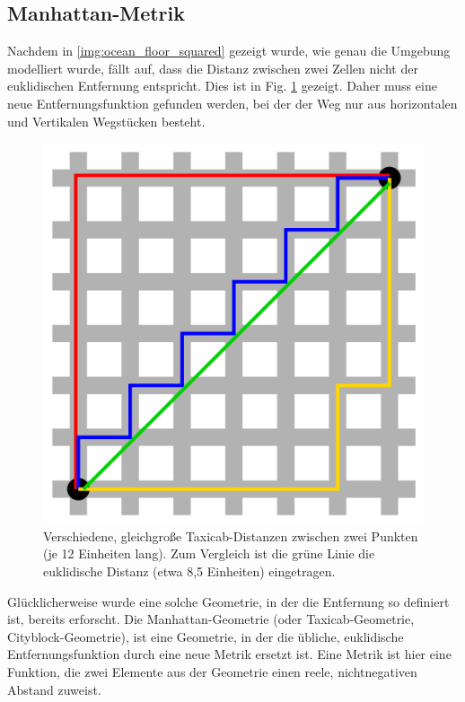\documentclass{article}
\begin{document}
\subsection{Manhattan-Metrik}
\label{sec:manhattan}

Nachdem in \ref{img:ocean_floor_squared} gezeigt wurde, wie genau die Umgebung
modelliert wurde, fällt auf, dass die Distanz zwischen zwei Zellen nicht der euklidischen Entfernung
entspricht. Dies ist in Fig. \ref{img:taxicab_euclid} gezeigt. Daher muss eine neue Entfernungsfunktion 
gefunden werden, bei der der Weg nur aus horizontalen und Vertikalen Wegstücken besteht.

\begin{figure}[!ht]
  \centering
  \includegraphics[width=.45\textwidth]{img/taxicab_distance.png}
  \caption{Verschiedene, gleichgroße Taxicab-Distanzen zwischen zwei Punkten (je 12 Einheiten lang). 
  Zum  Vergleich ist die grüne Linie die euklidische Distanz (etwa 8,5 Einheiten) eingetragen. \cite{wikicity}}
  \label{img:taxicab_euclid}
\end{figure}

Glücklicherweise wurde eine solche Geometrie, in der die Entfernung so definiert ist, bereits erforscht.
Die Manhattan-Geometrie (oder Taxicab-Geometrie, Cityblock-Geometrie), ist eine Geometrie, in der
die übliche, euklidische Entfernungsfunktion durch eine neue Metrik ersetzt ist. Eine Metrik ist hier
eine Funktion, die zwei Elemente aus der Geometrie einen reele, nichtnegativen Abstand zuweist.
\end{document}
